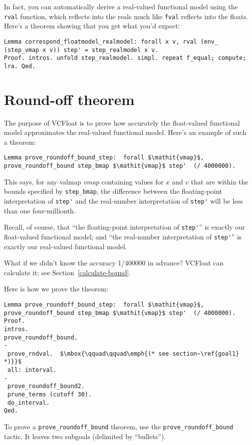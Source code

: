 \documentclass[article]{memoir}
\begin{document}
In fact, you can automatically derive a real-valued functional model
using the \lstinline{rval} function, which reflects into the reals
much like \lstinline{fval} reflects into the floats.  Here's
a theorem showing that you get what you'd expect:

\begin{lstlisting}
Lemma correspond_floatmodel_realmodel: forall x v, rval (env_ (step_vmap x v)) step' = step_realmodel x v.
Proof. intros. unfold step_realmodel. simpl. repeat f_equal; compute; lra. Qed. 
\end{lstlisting}

\chapter{Round-off theorem}
The purpose of VCFloat is to prove how accurately the
float-valued functional model approximates the real-valued
functional model.  Here's an example of such a theorem:
 
\begin{lstlisting}
Lemma prove_roundoff_bound_step:  forall $\mathit{vmap}$, prove_roundoff_bound step_bmap $\mathit{vmap}$ step'  (/ 4000000).
\end{lstlisting}
This says, for any valmap \emph{vmap}
containing values for $x$ and $v$
that are within the bounds specified by \lstinline{step_bmap},
the difference between the floating-point
interpretation of \lstinline{step'}
and the real-number interpretation of \lstinline{step'}
will be less than one four-millionth.

Recall, of course, that ``the floating-point interpretation of \lstinline{step'}'' is exactly our float-valued functional model;
and ``the real-number interpretation of \lstinline{step'}''
is exactly our real-valued functional model.

What if we didn't know the accuracy 1/400000 in advance?
VCFloat can calculate it; see Section~\ref{calculate-bound}.

Here is how we prove the theorem:
\begin{lstlisting}
Lemma prove_roundoff_bound_step:  forall $\mathit{vmap}$, prove_roundoff_bound step_bmap $\mathit{vmap}$ step'  (/ 4000000).
Proof.
intros.
prove_roundoff_bound.
-
 prove_rndval.  $\mbox{\qquad\qquad\emph{(* see section~\ref{goal1} *)}}$
 all: interval.
- 
 prove_roundoff_bound2.
 prune_terms (cutoff 30).
 do_interval.
Qed.
\end{lstlisting}
To prove a \lstinline{prove_roundoff_bound} theorem,
use the \lstinline{prove_roundoff_bound} tactic.
It leaves two subgoals (delimited by ``bullets'').
\end{document}
